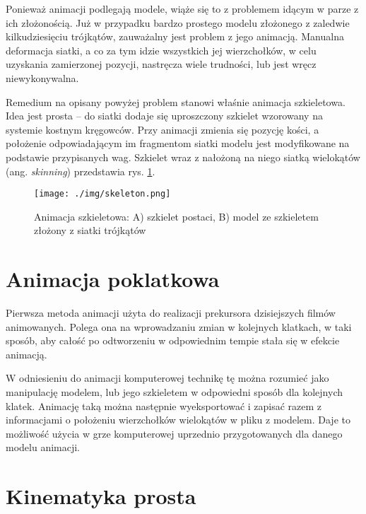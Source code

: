 \documentclass[11pt]{mwrep}
\begin{document}
Ponieważ animacji podlegają modele, wiąże się to z problemem idącym w parze z ich złożonością. Już w przypadku bardzo prostego modelu złożonego z zaledwie kilkudziesięciu trójkątów, zauważalny jest problem z jego animacją. Manualna deformacja siatki, a co za tym idzie wszystkich jej wierzchołków, w celu uzyskania zamierzonej pozycji, nastręcza wiele trudności, lub jest wręcz niewykonywalna.

Remedium na opisany powyżej problem stanowi właśnie animacja szkieletowa. Idea jest prosta -- do siatki dodaje się uproszczony szkielet wzorowany na systemie kostnym kręgowców. Przy animacji zmienia się pozycję kości, a położenie odpowiadającym im fragmentom siatki modelu jest modyfikowane na podstawie przypisanych wag. Szkielet wraz z nałożoną na niego siatką wielokątów (ang. \textit{skinning}) przedstawia rys. \ref{img:skeleton}.
    \begin{figure}
  \centering
    \texttt{[image: ./img/skeleton.png]}
  \caption{Animacja szkieletowa: A) szkielet postaci, B) model ze szkieletem złożony z siatki trójkątów}
  \label{img:skeleton}
  \end{figure}

  \section{Animacja poklatkowa}
  
Pierwsza metoda animacji użyta do realizacji prekursora dzisiejszych filmów animowanych. Polega ona na wprowadzaniu zmian w kolejnych klatkach, w taki sposób, aby całość po odtworzeniu w odpowiednim tempie stała się w efekcie animacją.

W odniesieniu do animacji komputerowej technikę tę można rozumieć jako manipulację modelem, lub jego szkieletem w odpowiedni sposób dla kolejnych klatek. Animację taką można następnie wyeksportować i zapisać razem z informacjami o położeniu wierzchołków wielokątów w pliku z modelem. Daje to możliwość użycia w grze komputerowej uprzednio przygotowanych dla danego modelu animacji.

  \section{Kinematyka prosta}
\end{document}
